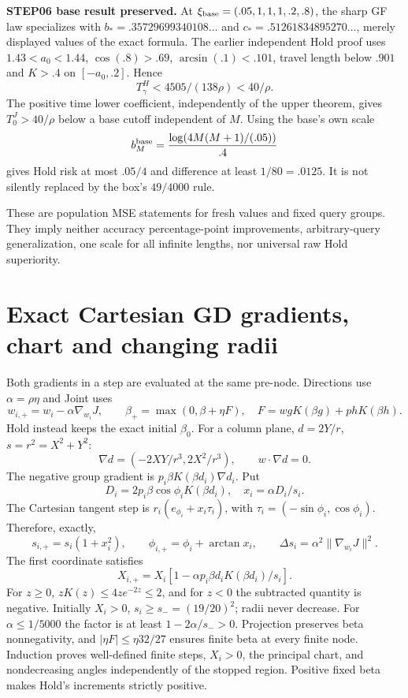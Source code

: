 \documentclass[11pt,a4paper]{article}
\begin{document}
\textbf{STEP06 base result preserved.} At $\xi_{\rm base}=(.05,1,1,1,.2,.8)$, the sharp GF law specializes with $b_*=.35729699340108\ldots$ and $c_*=.51261834895270\ldots$, merely displayed values of the exact formula. The earlier independent Hold proof uses $1.43<a_0<1.44$, $\cos(.8)>.69$, $\arcsin(.1)<.101$, travel length below $.901$ and $K>.4$ on $[-a_0,.2]$. Hence
\[
 T_\gamma^H<4505/(138\rho)<40/\rho.
\]
The positive time lower coefficient, independently of the upper theorem, gives $T_0^J>40/\rho$ below a base cutoff independent of $M$. Using the base's own scale
\[
 b_M^{\rm base}=\frac{\log(4M(M+1)/(.05))}{.4}
\]
gives Hold risk at most $.05/4$ and difference at least $1/80=.0125$. It is not silently replaced by the box's $49/4000$ rule.

These are population MSE statements for fresh values and fixed query groups. They imply neither accuracy percentage-point improvements, arbitrary-query generalization, one scale for all infinite lengths, nor universal raw Hold superiority.

\section{Exact Cartesian GD gradients, chart and changing radii}

Both gradients in a step are evaluated at the same pre-node. Directions use $\alpha=\rho\eta$ and Joint uses
\[
 w_{i,+}=w_i-\alpha\nabla_{w_i}J,\qquad
 \beta_+=\max(0,\beta+\eta F),\quad F=wgK(\beta g)+phK(\beta h).
\]
Hold instead keeps the exact initial $\beta_0$. For a column plane, $d=2Y/r$, $s=r^2=X^2+Y^2$:
\[
 \nabla d=(-2XY/r^3,2X^2/r^3),\qquad w\cdot\nabla d=0 .
\]
The negative group gradient is $p_i\beta K(\beta d_i)\nabla d_i$. Put
\[
 D_i=2p_i\beta\cos\phi_iK(\beta d_i),\quad x_i=\alpha D_i/s_i.
\]
The Cartesian tangent step is $r_i(e_{\phi_i}+x_i\tau_i)$, with $\tau_i=(-\sin\phi_i,\cos\phi_i)$. Therefore, exactly,
\[
 s_{i,+}=s_i(1+x_i^2),\qquad \phi_{i,+}=\phi_i+\arctan x_i,
 \qquad \Delta s_i=\alpha^2\|\nabla_{w_i}J\|^2 .
\]
The first coordinate satisfies
\[
 X_{i,+}=X_i[1-\alpha p_i\beta d_iK(\beta d_i)/s_i].
\]
For $z\ge0$, $zK(z)\le4ze^{-2z}\le2$, and for $z<0$ the subtracted quantity is negative. Initially $X_i>0$, $s_i\ge s_-=(19/20)^2$; radii never decrease. For $\alpha\le1/5000$ the factor is at least $1-2\alpha/s_->0$. Projection preserves beta nonnegativity, and $|\eta F|\le\eta32/27$ ensures finite beta at every finite node. Induction proves well-defined finite steps, $X_i>0$, the principal chart, and nondecreasing angles independently of the stopped region. Positive fixed beta makes Hold's increments strictly positive.
\end{document}
